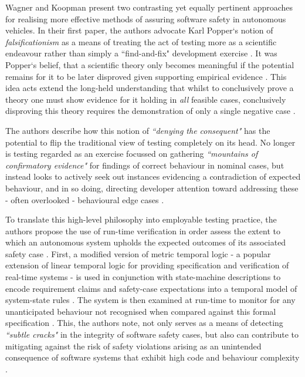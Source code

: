 \documentclass[conference]{IEEEtran}
\begin{document}
 Wagner and Koopman present two contrasting yet equally pertinent approaches for realising more effective methods of assuring software safety in autonomous vehicles. In their first paper, the authors advocate Karl Popper`s notion of \textit{falsificationism} as a means of treating the act of testing more as a scientific endeavour rather than simply a ``find-and-fix" development exercise \cite{wagner-1}. It was Popper`s belief, that a scientific theory only becomes  meaningful if the potential remains for it to be later disproved given supporting empirical evidence \cite{popper}. This idea acts extend the long-held understanding that whilst to conclusively prove a theory one must show evidence for it holding in \textit{all} feasible cases, conclusively disproving this theory requires the demonstration of only a single negative case \cite{wagner-1}. 
 
 The authors describe how this notion of \textit{``denying the consequent"} has the potential to flip the traditional view of testing completely on its head. No  longer is testing regarded as an exercise focussed on gathering \textit{``mountains of confirmatory evidence"} for findings of correct behaviour in nominal cases, but instead looks to actively seek out instances evidencing a contradiction of expected behaviour, and in so doing, directing developer attention toward addressing these - often overlooked - behavioural edge cases \cite{wagner-1}. 
 
 To translate this high-level philosophy into employable testing practice, the authors propose the use of run-time verification in order assess the extent to which an autonomous system upholds the expected outcomes of its associated safety case \cite{wagner-1}. First, a modified version of metric temporal logic - a popular extension of linear temporal logic for providing specification and verification of real-time systems - is used in conjunction with state-machine descriptions to encode requirement claims and safety-case expectations into a temporal model of system-state rules \cite{wagner-1}. The system is then examined at run-time to monitor for any unanticipated behaviour not recognised when compared against this formal specification \cite{wagner-1}. This, the authors note, not only serves as a means of detecting \textit{``subtle cracks"} in the integrity of software safety cases, but also can contribute to mitigating against the risk of safety violations arising as an unintended consequence of software systems that exhibit high code and behaviour complexity \cite{wagner-1}.
 
\end{document}
